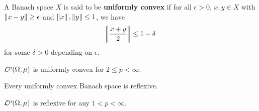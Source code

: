 \begin{definition}
    A Banach space $X$ is said to be \textbf{uniformly convex} if for 
    all $\epsilon>0$, $x,y\in X$ with $\left\lVert {x-y} \right\rVert\geq \epsilon$ and 
    $\left\lVert {x} \right\rVert,\left\lVert {y} \right\rVert\leq 1$, we have 
    \begin{equation*}
        \left\lVert {\frac{x+y}{2}} \right\rVert \leq 1-\delta
    \end{equation*}
    for some $\delta>0$ depending on $\epsilon$.
\end{definition}

\begin{theorem}
    $\mathcal{L}^p(\Omega,\mu)$ is uniformly convex for $2\leq p <\infty$.
\end{theorem}

\begin{theorem}
    Every uniformly convex Banach space is reflexive.
\end{theorem}

\begin{corollary}
    $\mathcal{L}^p(\Omega,\mu)$ is reflexive for any $1< p <\infty$.
\end{corollary}